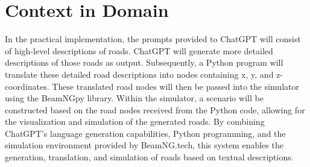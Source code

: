 \section{Context in Domain}
In the practical implementation, the prompts provided to ChatGPT will consist of high-level descriptions of roads. ChatGPT will generate more detailed descriptions of those roads as output. Subsequently, a Python program will translate these detailed road descriptions into nodes containing x, y, and z-coordinates. These translated road nodes will then be passed into the simulator using the BeamNGpy library. Within the simulator, a scenario will be constructed based on the road nodes received from the Python code, allowing for the visualization and simulation of the generated roads. By combining ChatGPT’s language generation capabilities, Python programming, and the simulation environment provided by BeamNG.tech, this system enables the generation, translation, and simulation of roads based on textual descriptions.
